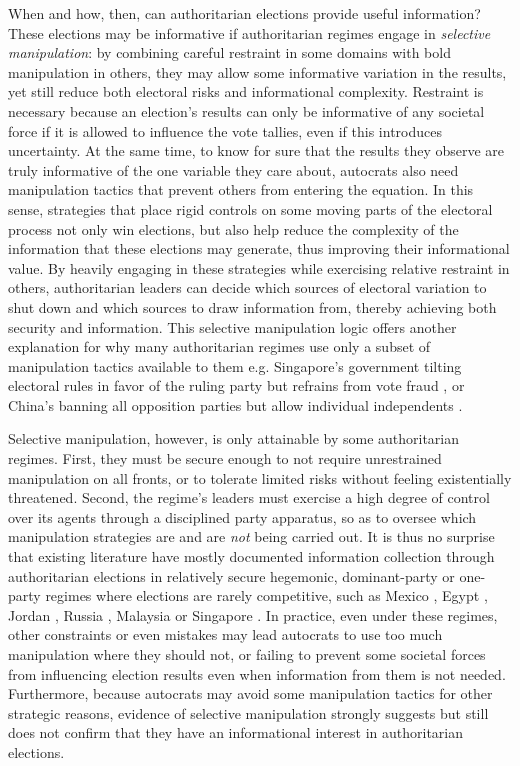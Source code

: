 \documentclass[12pt]{article}
\newcommand{\1}{\mathbbm{1}}
\begin{document}
When and how, then, can authoritarian elections provide useful information? These elections may be informative if authoritarian regimes engage in \textit{selective manipulation}: by combining careful restraint in some domains with bold manipulation in others, they may allow some informative variation in the results, yet still reduce both electoral risks and informational complexity. Restraint is necessary because an election's results can only be informative of any societal force if it is allowed to influence the vote tallies, even if this introduces uncertainty. At the same time, to know for sure that the results they observe are truly informative of the one variable they care about, autocrats also need manipulation tactics that prevent others from entering the equation. In this sense, strategies that place rigid controls on some moving parts of the electoral process not only win elections, but also help reduce the complexity of the information that these elections may generate, thus improving their informational value. By heavily engaging in these strategies while exercising relative restraint in others, authoritarian leaders can decide which sources of electoral variation to shut down and which sources to draw information from, thereby achieving both security and information. This selective manipulation logic offers another explanation for why many authoritarian regimes use only a subset of manipulation tactics available to them e.g. Singapore's government tilting electoral rules in favor of the ruling party but refrains from vote fraud \citep{Tan2013}, or China's banning all opposition parties but allow individual independents \citep[see][for a typology of these independents]{Junzhi2010}.

Selective manipulation, however, is only attainable by some authoritarian regimes. First, they must be secure enough to not require unrestrained manipulation on all fronts, or to tolerate limited risks without feeling existentially threatened. Second, the regime's leaders must exercise a high degree of control over its agents through a disciplined party apparatus, so as to oversee which manipulation strategies are and are \textit{not} being carried out. It is thus no surprise that existing literature have mostly documented information collection through authoritarian elections in relatively secure hegemonic, dominant-party or one-party regimes where elections are rarely competitive, such as Mexico \citep{Magaloni2006}, Egypt \citep{Blaydes2010}, Jordan \citep{LustOkar2005}, Russia \citep{Myagkov2009, RundlettSvolik2016}, Malaysia \citep{Brownlee2007} or Singapore \citep{Miller2015}. In practice, even under these regimes, other constraints or even mistakes may lead autocrats to use too much manipulation where they should not, or failing to prevent some societal forces from influencing election results even when information from them is not needed. Furthermore, because autocrats may avoid some manipulation tactics for other strategic reasons, evidence of selective manipulation strongly suggests but still does not confirm that they have an informational interest in authoritarian elections.
\end{document}

